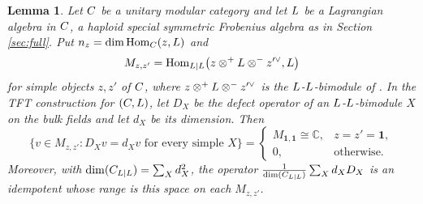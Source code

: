 \documentclass[leqno]{article}
\newcommand{\Cbb}{\ensuremath{\mathbb{C}}}
\let\cal\relax
\newcommand{\cal}{\mathcal}
\newcommand{\ot}{\otimes}
\newtheorem{lemma}[thm]{Lemma}
\numberwithin{equation}{section}
\begin{document}
\begin{lemma}
\label{lem:fusion-algebra-bulk-blocks}
Let $\cal C$ be a unitary modular category and let $\cal L$ be a Lagrangian algebra in $\cal C$, a haploid special symmetric Frobenius algebra as in Section \ref{sec:full}. Put $n_z = \dim\operatorname{Hom}_{\cal C}(z,\cal L)$ and
\[
M_{z,z'} = \operatorname{Hom}_{\cal L|\cal L}\bigl(z\ot^+\cal L\ot^-z'^\vee,\cal L\bigr)
\]
for simple objects $z,z'$ of $\cal C$, where $z\ot^+\cal L\ot^-z'^\vee$ is the $\cal L$-$\cal L$-bimodule of \cite[Section 2.2]{FFRS07}. In the TFT construction for $(\cal C,\cal L)$, let $D_X$ be the defect operator of an $\cal L$-$\cal L$-bimodule $X$ on the bulk fields and let $d_X$ be its dimension. Then
\[
\bigl\{v \in M_{z,z'}:D_Xv = d_Xv\text{ for every simple }X\bigr\} =
\begin{cases}
M_{\mathbf1,\mathbf1} \cong \Cbb,&z = z' = \mathbf1,\\
0,&\text{otherwise}.
\end{cases}
\]
Moreover, with $\dim(\cal C_{\cal L|\cal L}) = \sum_Xd_X^2$, the operator $\frac1{\dim(\cal C_{\cal L|\cal L})}\sum_Xd_XD_X$ is an idempotent whose range is this space on each $M_{z,z'}$.
\end{lemma}
\end{document}
